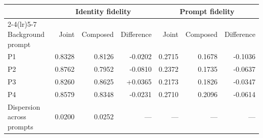 \begin{tabular}{lrrrrrr}
\toprule
& \multicolumn{3}{c}{Identity fidelity} & \multicolumn{3}{c}{Prompt fidelity} \\
\cmidrule(lr){2-4}\cmidrule(lr){5-7}
Background prompt & Joint & Composed & Difference & Joint & Composed & Difference \\
\midrule
P1 & 0.8328 & 0.8126 & -0.0202 & 0.2715 & 0.1678 & -0.1036 \\
P2 & 0.8762 & 0.7952 & -0.0810 & 0.2372 & 0.1735 & -0.0637 \\
P3 & 0.8260 & 0.8625 & +0.0365 & 0.2173 & 0.1826 & -0.0347 \\
P4 & 0.8579 & 0.8348 & -0.0231 & 0.2710 & 0.2096 & -0.0614 \\
\midrule
Dispersion across prompts & 0.0200 & 0.0252 & --- & --- & --- & --- \\
\bottomrule
\end{tabular}
